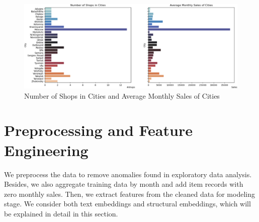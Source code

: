 \documentclass{article}
\begin{document}
\begin{figure}[!ht]
    \centering
    \includegraphics[width=16.5cm]{./figs/city-sales.png}
    \caption{Number of Shops in Cities and Average Monthly Sales of Cities}
    \label{fig:city}
\end{figure}

\section{Preprocessing and Feature Engineering}
We preprocess the data to remove anomalies found in exploratory data analysis. Besides, we also aggregate training data by month and add item records with zero monthly sales. Then, we extract features from the cleaned data for modeling stage. We consider both text embeddings and structural embeddings, which will be explained in detail in this section.
\end{document}

